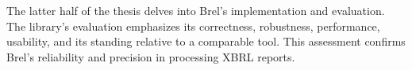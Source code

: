 The latter half of the thesis delves into Brel's implementation and evaluation.
The library's evaluation emphasizes its correctness, robustness, performance, usability,
and its standing relative to a comparable tool.
This assessment confirms Brel's reliability and precision in processing XBRL reports.
